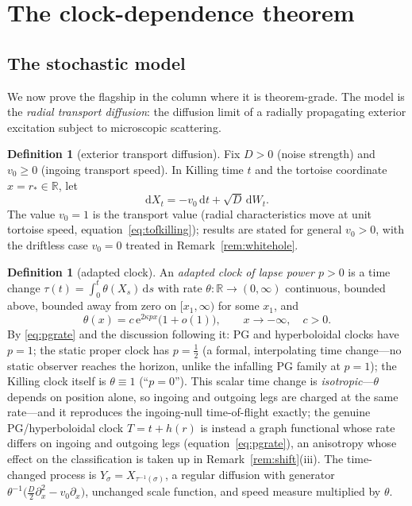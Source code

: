 \documentclass[11pt]{article}
\theoremstyle{definition}
\newtheorem{definition}[theorem]{Definition}
\theoremstyle{remark}
\newcommand{\ee}{\mathrm{e}}
\newcommand{\dd}{\mathrm{d}}
\newcommand{\rstar}{r_{*}}
\begin{document}
\section{The clock-dependence theorem}
\label{sec:clock}

\subsection{The stochastic model}

We now prove the flagship in the column where it is theorem-grade.
The model is the \emph{radial transport diffusion}: the diffusion
limit of a radially propagating exterior excitation subject to
microscopic scattering.

\begin{definition}[exterior transport diffusion]
\label{def:model}
Fix $D>0$ (noise strength) and $v_{0}\ge 0$ (ingoing transport
speed). In Killing time $t$ and the tortoise coordinate
$x=\rstar\in\mathbb{R}$, let
\begin{equation}
\dd X_{t}=-v_{0}\,\dd t+\sqrt{D}\,\dd W_{t}.
\label{eq:sde}
\end{equation}
The value $v_{0}=1$ is the transport value (radial characteristics
move at unit tortoise speed, equation~\eqref{eq:tofkilling}); results
are stated for general $v_{0}>0$, with the driftless case $v_{0}=0$
treated in Remark~\ref{rem:whitehole}.
\end{definition}

\begin{definition}[adapted clock]
\label{def:clock}
An \emph{adapted clock of lapse power $p>0$} is a time change
$\tau(t)=\int_{0}^{t}\theta(X_{s})\,\dd s$ with rate
$\theta:\mathbb{R}\to(0,\infty)$ continuous, bounded above, bounded
away from zero on $[x_{1},\infty)$ for some $x_{1}$, and
\begin{equation}
\theta(x)=c\,\ee^{2\kappa p x}\bigl(1+o(1)\bigr),
\qquad x\to-\infty,\quad c>0 .
\end{equation}
By \eqref{eq:pgrate} and the discussion following it: PG and
hyperboloidal clocks have $p=1$; the static proper clock has
$p=\tfrac12$ (a formal, interpolating time change---no static observer
reaches the horizon, unlike the infalling PG family at $p=1$); the
Killing clock itself is $\theta\equiv1$ (``$p=0$'').
This scalar time change is \emph{isotropic}---$\theta$ depends on
position alone, so ingoing and outgoing legs are charged at the same
rate---and it reproduces the ingoing-null time-of-flight exactly;
the genuine PG/hyperboloidal clock $T=t+h(r)$ is instead a graph
functional whose rate differs on ingoing and outgoing legs
(equation~\eqref{eq:pgrate}), an anisotropy whose effect on the
classification is taken up in Remark~\ref{rem:shift}(iii).
The time-changed process is
$Y_{\sigma}=X_{\tau^{-1}(\sigma)}$, a regular diffusion with
generator $\theta^{-1}\bigl(\tfrac{D}{2}\partial_{x}^{2}
-v_{0}\partial_{x}\bigr)$, unchanged scale function, and speed measure
multiplied by $\theta$.
\end{definition}
\end{document}
